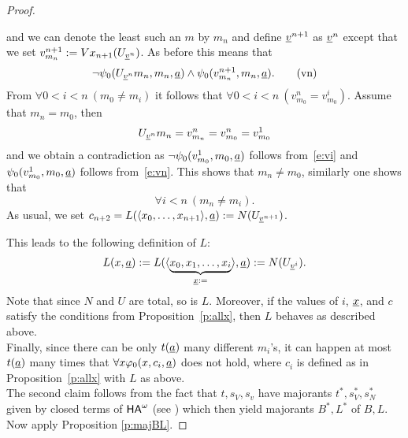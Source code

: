\begin{proof}
\begin{enumerate}
\[\]
and we can denote the least such an $m$ by $m_n$ and define $\underline v^{n+1}$ as $\underline v^n$ except that we set $v^{n+1}_{m_n}:=Vx_{n+1}(U_{\underline v^n})$. As before this means that
\[ \neg\psi_0(U_{\underline v^n}m_n,m_n,\underline a) \wedge \psi_0(v^{n+1}_{m_n},m_n,\underline a). \tag{vn}\label{e:vn}\]
From $\forall 0<i<n\ ( m_0\neq m_i )$ it follows that $\forall0<i<n\ ( v^n_{m_0}=v^i_{m_0})$. Assume that $m_n = m_0$, then
\[U_{\underline v^n}m_n=v^n_{m_n}=v^n_{m_0}=v^1_{m_0}\]
and we obtain a contradiction as $\neg\psi_0(v^1_{m_0},m_0,\underline a)$ follows from~\eqref{e:vi} and $\psi_0(v^1_{m_0},m_0,\underline a)$ follows from~\eqref{e:vn}. This shows that 
$m_n \neq m_0$, similarly one shows that \[ \forall i<n\ (m_n \neq m_i).\]
As usual, we set $c_{n+2}=L(\langle x_0,\ldots,x_{n+1}\rangle,\underline a):=
N(U_{\underline v^{n+1}})$.
\end{enumerate}
This leads to the following definition of $L$:
\begin{align*}
 L(x,\underline a):= 
 L(\langle \underbrace {x_0,x_1,\ldots,x_i}_{\underline x:=}\rangle,\underline a):=
N(U_{\underline v^{i}}). 
\end{align*}
Note that since $N$ and $U$ are total, so is $L$. 
Moreover, if the values of $i$, $\underline x$, and $c$ satisfy the conditions from Proposition~\ref{p:allx}, then $L$ 
behaves as described above.\\
Finally, since there can be only $t(\underline a)$ many different $m_i$'s, it can happen at most $t(\underline a)$ many 
times that $\forall x \varphi_0(x,c_i,\underline a)$ does not hold, where
$c_i$ is defined as in Proposition~\ref{p:allx} with $L$ as above. \\ The 
second claim follows from the fact that $t,s_V,s_v$ have majorants $t^*,
s^*_V,s^*_N$ 
given by closed terms of ${\textsf{\upshape HA}}^\omega$ (see \cite{Kohlenbach08}) which then 
yield majorants $B^*,L^*$ of $B,L.$ Now apply  
Proposition \ref{p:majBL}.
\end{proof} 
